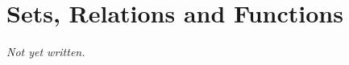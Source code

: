 \chapter{Sets, Relations and Functions}\label{ch:sets-relations-functions}


\textit{Not yet written.}
